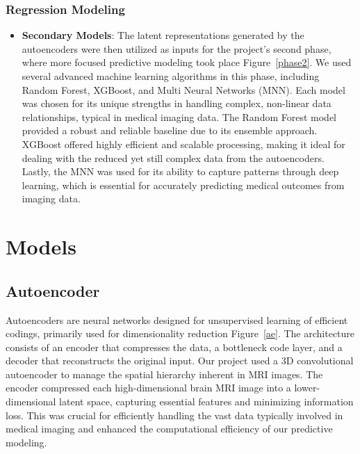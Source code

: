 \documentclass[conference,compsoc]{IEEEtran}
\begin{document}
\subsubsection{Regression Modeling}

\begin{itemize}
	\item {\textbf{Secondary Models}}: The latent representations generated by the autoencoders were then utilized as inputs for the project's second phase, where more focused predictive modeling took place Figure~\ref{phase2}. We used several advanced machine learning algorithms in this phase, including Random Forest, XGBoost, and Multi Neural Networks (MNN). Each model was chosen for its unique strengths in handling complex, non-linear data relationships, typical in medical imaging data. The Random Forest model provided a robust and reliable baseline due to its ensemble approach. XGBoost offered highly efficient and scalable processing, making it ideal for dealing with the reduced yet still complex data from the autoencoders. Lastly, the MNN was used for its ability to capture patterns through deep learning, which is essential for accurately predicting medical outcomes from imaging data.
\end{itemize}



\section{Models}
\subsection{Autoencoder} Autoencoders are neural networks designed for unsupervised learning of efficient codings, primarily used for dimensionality reduction Figure~\ref{ae}. The architecture consists of an encoder that compresses the data, a bottleneck code layer, and a decoder that reconstructs the original input. Our project used a 3D convolutional autoencoder to manage the spatial hierarchy inherent in MRI images. The encoder compressed each high-dimensional brain MRI image into a lower-dimensional latent space, capturing essential features and minimizing information loss. This was crucial for efficiently handling the vast data typically involved in medical imaging and enhanced the computational efficiency of our predictive modeling.
\end{document}
